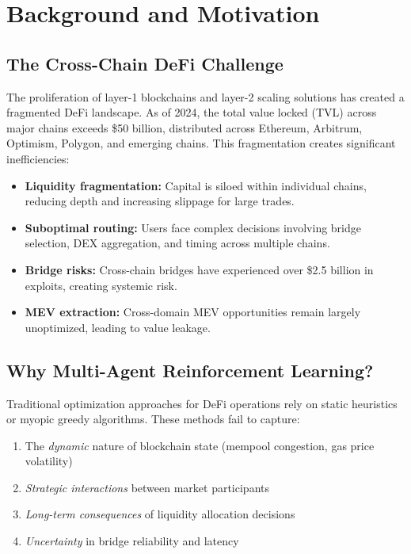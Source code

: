 \documentclass[11pt,a4paper]{article}
\begin{document}
\tableofcontents
\newpage

\section{Background and Motivation}\label{sec:intro}

\subsection{The Cross-Chain DeFi Challenge}

The proliferation of layer-1 blockchains and layer-2 scaling solutions has created a fragmented DeFi landscape. As of 2024, the total value locked (TVL) across major chains exceeds \$50 billion, distributed across Ethereum, Arbitrum, Optimism, Polygon, and emerging chains\cite{defillama2024}. This fragmentation creates significant inefficiencies:

\begin{itemize}[leftmargin=2em]
    \item \textbf{Liquidity fragmentation:} Capital is siloed within individual chains, reducing depth and increasing slippage for large trades.
    \item \textbf{Suboptimal routing:} Users face complex decisions involving bridge selection, DEX aggregation, and timing across multiple chains.
    \item \textbf{Bridge risks:} Cross-chain bridges have experienced over \$2.5 billion in exploits\cite{chainalysis2023}, creating systemic risk.
    \item \textbf{MEV extraction:} Cross-domain MEV opportunities remain largely unoptimized, leading to value leakage.
\end{itemize}

\subsection{Why Multi-Agent Reinforcement Learning?}

Traditional optimization approaches for DeFi operations rely on static heuristics or myopic greedy algorithms. These methods fail to capture:
\begin{enumerate}[leftmargin=2em]
    \item The \textit{dynamic} nature of blockchain state (mempool congestion, gas price volatility)
    \item \textit{Strategic interactions} between market participants
    \item \textit{Long-term consequences} of liquidity allocation decisions
    \item \textit{Uncertainty} in bridge reliability and latency
\end{enumerate}
\end{document}
